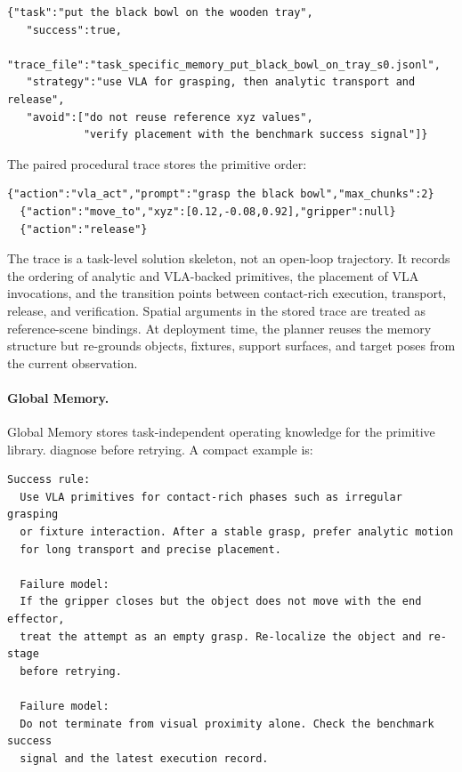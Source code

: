 \documentclass[11pt]{article}
\begin{document}
  \begin{samepage}
  \begin{lstlisting}[frame=single,framerule=0.5pt]
  {"task":"put the black bowl on the wooden tray",
   "success":true,
   "trace_file":"task_specific_memory_put_black_bowl_on_tray_s0.jsonl",
   "strategy":"use VLA for grasping, then analytic transport and release",
   "avoid":["do not reuse reference xyz values",
            "verify placement with the benchmark success signal"]}
  \end{lstlisting}
  \end{samepage}

  The paired procedural trace stores the primitive order:

  \begin{samepage}
  \begin{lstlisting}[frame=single,framerule=0.5pt]
  {"action":"vla_act","prompt":"grasp the black bowl","max_chunks":2}
  {"action":"move_to","xyz":[0.12,-0.08,0.92],"gripper":null}
  {"action":"release"}
  \end{lstlisting}
  \end{samepage}

  The trace is a task-level solution skeleton, not an open-loop trajectory. It records
  the ordering of analytic and VLA-backed primitives, the placement of VLA invocations,
  and the transition points between contact-rich execution, transport, release, and
  verification. Spatial arguments in the stored trace are treated as reference-scene
  bindings. At deployment time, the planner reuses the memory structure but re-grounds
  objects, fixtures, support surfaces, and target poses from the current observation.

  \paragraph{Global Memory.}
  Global Memory stores task-independent operating knowledge for the primitive library.
  diagnose before retrying. A compact example is:

  \begin{samepage}
  \begin{lstlisting}[frame=single,framerule=0.5pt]
  Success rule:
  Use VLA primitives for contact-rich phases such as irregular grasping
  or fixture interaction. After a stable grasp, prefer analytic motion
  for long transport and precise placement.

  Failure model:
  If the gripper closes but the object does not move with the end effector,
  treat the attempt as an empty grasp. Re-localize the object and re-stage
  before retrying.

  Failure model:
  Do not terminate from visual proximity alone. Check the benchmark success
  signal and the latest execution record.
  \end{lstlisting}
  \end{samepage}
\end{document}
